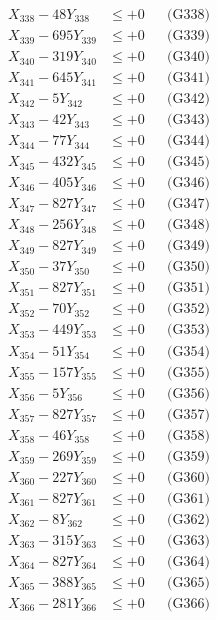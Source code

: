 \documentclass[a4paper,10pt]{article}
\begin{document}
{\begin{align}
X_{338} - 48Y_{338} &\leq +0 && \text{(G338)} \\
X_{339} - 695Y_{339} &\leq +0 && \text{(G339)} \\
X_{340} - 319Y_{340} &\leq +0 && \text{(G340)} \\
\allowbreak
X_{341} - 645Y_{341} &\leq +0 && \text{(G341)} \\
X_{342} - 5Y_{342} &\leq +0 && \text{(G342)} \\
X_{343} - 42Y_{343} &\leq +0 && \text{(G343)} \\
X_{344} - 77Y_{344} &\leq +0 && \text{(G344)} \\
X_{345} - 432Y_{345} &\leq +0 && \text{(G345)} \\
X_{346} - 405Y_{346} &\leq +0 && \text{(G346)} \\
X_{347} - 827Y_{347} &\leq +0 && \text{(G347)} \\
X_{348} - 256Y_{348} &\leq +0 && \text{(G348)} \\
X_{349} - 827Y_{349} &\leq +0 && \text{(G349)} \\
X_{350} - 37Y_{350} &\leq +0 && \text{(G350)} \\
\allowbreak
X_{351} - 827Y_{351} &\leq +0 && \text{(G351)} \\
X_{352} - 70Y_{352} &\leq +0 && \text{(G352)} \\
X_{353} - 449Y_{353} &\leq +0 && \text{(G353)} \\
X_{354} - 51Y_{354} &\leq +0 && \text{(G354)} \\
X_{355} - 157Y_{355} &\leq +0 && \text{(G355)} \\
X_{356} - 5Y_{356} &\leq +0 && \text{(G356)} \\
X_{357} - 827Y_{357} &\leq +0 && \text{(G357)} \\
X_{358} - 46Y_{358} &\leq +0 && \text{(G358)} \\
X_{359} - 269Y_{359} &\leq +0 && \text{(G359)} \\
X_{360} - 227Y_{360} &\leq +0 && \text{(G360)} \\
\allowbreak
X_{361} - 827Y_{361} &\leq +0 && \text{(G361)} \\
X_{362} - 8Y_{362} &\leq +0 && \text{(G362)} \\
X_{363} - 315Y_{363} &\leq +0 && \text{(G363)} \\
X_{364} - 827Y_{364} &\leq +0 && \text{(G364)} \\
X_{365} - 388Y_{365} &\leq +0 && \text{(G365)} \\
X_{366} - 281Y_{366} &\leq +0 && \text{(G366)} \\

\end{align}}
\end{document}
